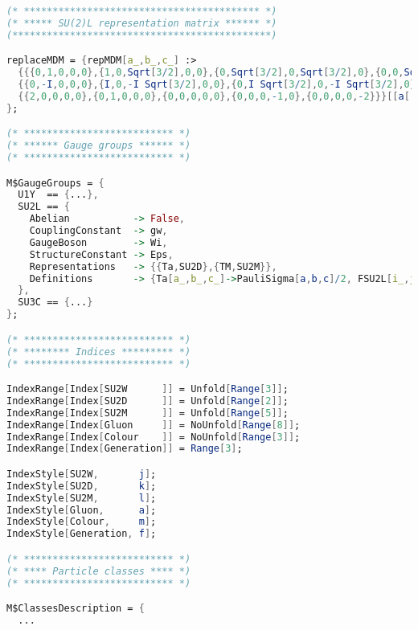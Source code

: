 \documentclass[12pt,twoside,book]{article}
\begin{document}
\begin{lstlisting}[caption=\texttt{mdm.fr}, label=list:mdm, language=Mathematica]
(* ***************************************** *)
(* ***** SU(2)L representation matrix ****** *)
(*********************************************)

replaceMDM = {repMDM[a_,b_,c_] :>
  {{{0,1,0,0,0},{1,0,Sqrt[3/2],0,0},{0,Sqrt[3/2],0,Sqrt[3/2],0},{0,0,Sqrt[3/2],0,1},{0,0,0,1,0}},
  {{0,-I,0,0,0},{I,0,-I Sqrt[3/2],0,0},{0,I Sqrt[3/2],0,-I Sqrt[3/2],0},{0,0,I Sqrt[3/2],0,-I},{0,0,0,I,0}},
  {{2,0,0,0,0},{0,1,0,0,0},{0,0,0,0,0},{0,0,0,-1,0},{0,0,0,0,-2}}}[[a[[2]],b[[2]],c[[2]]]]
};

(* ************************** *)
(* ****** Gauge groups ****** *)
(* ************************** *)

M$GaugeGroups = {
  U1Y  == {...},
  SU2L == {
    Abelian           -> False,
    CouplingConstant  -> gw,
    GaugeBoson        -> Wi,
    StructureConstant -> Eps,
    Representations   -> {{Ta,SU2D},{TM,SU2M}},
    Definitions       -> {Ta[a_,b_,c_]->PauliSigma[a,b,c]/2, FSU2L[i_,j_,k_]:> I Eps[i,j,k], TM[a_,b_,c_]->repMDM[a,b,c]}
  },
  SU3C == {...}
};

(* ************************** *)
(* ******** Indices ********* *)
(* ************************** *)

IndexRange[Index[SU2W      ]] = Unfold[Range[3]];
IndexRange[Index[SU2D      ]] = Unfold[Range[2]];
IndexRange[Index[SU2M      ]] = Unfold[Range[5]];
IndexRange[Index[Gluon     ]] = NoUnfold[Range[8]];
IndexRange[Index[Colour    ]] = NoUnfold[Range[3]];
IndexRange[Index[Generation]] = Range[3];

IndexStyle[SU2W,       j];
IndexStyle[SU2D,       k];
IndexStyle[SU2M,       l];
IndexStyle[Gluon,      a];
IndexStyle[Colour,     m];
IndexStyle[Generation, f];

(* ************************** *)
(* **** Particle classes **** *)
(* ************************** *)

M$ClassesDescription = {
  ...


\end{lstlisting}
\end{document}
